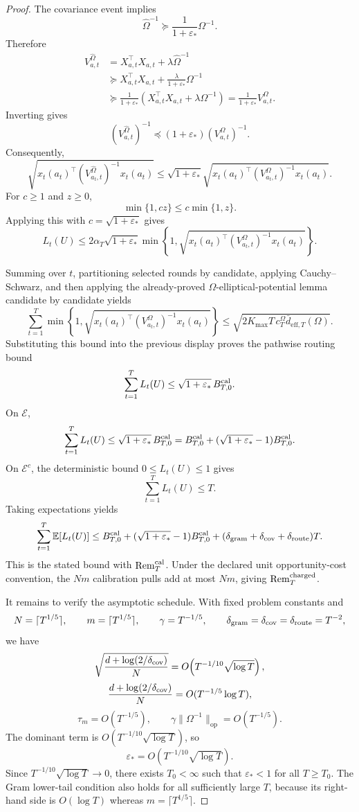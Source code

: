 \documentclass{article} %
\begin{document}
\begin{proof}
The covariance event implies
\[
\widehat\Omega^{-1}\succeq \frac{1}{1+\varepsilon_*}\Omega^{-1}.
\]
Therefore
\[
\begin{aligned}
V_{a,t}^{\widehat\Omega}
&=
X_{a,t}^\top X_{a,t}+\lambda\widehat\Omega^{-1}
\\
&\succeq
X_{a,t}^\top X_{a,t}
+
\frac{\lambda}{1+\varepsilon_*}\Omega^{-1}
\\
&\succeq
\frac{1}{1+\varepsilon_*}
\left(
X_{a,t}^\top X_{a,t}+\lambda\Omega^{-1}
\right)
=
\frac{1}{1+\varepsilon_*}V_{a,t}^{\Omega}.
\end{aligned}
\]
Inverting gives
\[
(V_{a,t}^{\widehat\Omega})^{-1}
\preceq
(1+\varepsilon_*)(V_{a,t}^{\Omega})^{-1}.
\]
Consequently,
\[
\sqrt{
x_t(a_t)^\top
(V_{a_t,t}^{\widehat\Omega})^{-1}
x_t(a_t)
}
\le
\sqrt{1+\varepsilon_*}
\sqrt{
x_t(a_t)^\top
(V_{a_t,t}^{\Omega})^{-1}
x_t(a_t)
}.
\]
For \(c\ge1\) and \(z\ge0\),
\[
\min\{1,cz\}\le c\min\{1,z\}.
\]
Applying this with \(c=\sqrt{1+\varepsilon_*}\) gives
\[
L_t(U)
\le
2\alpha_T\sqrt{1+\varepsilon_*}
\min\!\left\{
1,
\sqrt{
x_t(a_t)^\top
(V_{a_t,t}^{\Omega})^{-1}
x_t(a_t)
}
\right\}.
\]

Summing over \(t\), partitioning selected rounds by candidate, applying
Cauchy--Schwarz, and then applying the already-proved
\(\Omega\)-elliptical-potential lemma candidate by candidate yields
\[
\sum_{t=1}^T
\min\!\left\{
1,
\sqrt{
x_t(a_t)^\top
(V_{a_t,t}^{\Omega})^{-1}
x_t(a_t)
}
\right\}
\le
\sqrt{
2K_{\max}T\,c_T^\Omega
\bar d_{\mathrm{eff},T}(\Omega)
}.
\]
Substituting this bound into the previous display proves the pathwise routing
bound
\[
\sum_{t=1}^T L_t(U)
\le
\sqrt{1+\varepsilon_*}\,B_{T,0}^{\rm cal}.
\]
On \(\mathcal{E}\),
\[
\sum_{t=1}^T L_t(U)
\le
\sqrt{1+\varepsilon_*}\,B_{T,0}^{\rm cal}
=
B_{T,0}^{\rm cal}
+
(\sqrt{1+\varepsilon_*}-1)B_{T,0}^{\rm cal}.
\]
On \(\mathcal{E}^c\), the deterministic bound \(0\le L_t(U)\le1\) gives
\[
\sum_{t=1}^T L_t(U)\le T.
\]
Taking expectations yields
\[
\sum_{t=1}^T\mathbb{E}[L_t(U)]
\le
B_{T,0}^{\rm cal}
+
(\sqrt{1+\varepsilon_*}-1)B_{T,0}^{\rm cal}
+
(\delta_{\rm gram}+\delta_{\rm cov}+\delta_{\rm route})T.
\]
This is the stated bound with \(\operatorname{Rem}_T^{\rm cal}\). Under the
declared unit opportunity-cost convention, the \(Nm\) calibration pulls add at
most \(Nm\), giving \(\operatorname{Rem}_T^{\rm charged}\).

It remains to verify the asymptotic schedule.  With fixed problem constants and
\[
N=\lceil T^{1/5}\rceil,\qquad
m=\lceil T^{1/5}\rceil,\qquad
\gamma=T^{-1/5},\qquad
\delta_{\rm gram}=\delta_{\rm cov}=\delta_{\rm route}=T^{-2},
\]
we have
\[
\sqrt{\frac{d+\log(2/\delta_{\rm cov})}{N}}
=
O\!\left(T^{-1/10}\sqrt{\log T}\right),
\]
\[
\frac{d+\log(2/\delta_{\rm cov})}{N}
=
O(T^{-1/5}\log T),
\]
\[
\tau_m=O(T^{-1/5}),
\qquad
\gamma\|\Omega^{-1}\|_{\mathrm{op}}=O(T^{-1/5}).
\]
The dominant term is \(O(T^{-1/10}\sqrt{\log T})\), so
\[
\varepsilon_*
=
O\!\left(T^{-1/10}\sqrt{\log T}\right).
\]
Since \(T^{-1/10}\sqrt{\log T}\to0\), there exists \(T_0<\infty\) such that
\(\varepsilon_*<1\) for all \(T\ge T_0\).  The Gram lower-tail condition also
holds for all sufficiently large \(T\), because its right-hand side is
\(O(\log T)\) whereas \(m=\lceil T^{1/5}\rceil\).


\end{proof}
\end{document}
